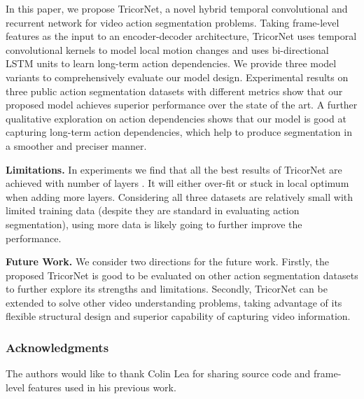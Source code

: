 \documentclass{article}
\begin{document}
In this paper, we propose TricorNet, a novel hybrid temporal convolutional and recurrent network for video action segmentation problems. Taking frame-level features as the input to an encoder-decoder architecture, TricorNet uses temporal convolutional kernels to model local motion changes and uses bi-directional LSTM units to learn long-term action dependencies. We provide three model variants to comprehensively evaluate our model design. Experimental results on three public action segmentation datasets with different metrics show that our proposed model achieves superior performance over the state of the art. A further qualitative exploration on action dependencies shows that our model is good at capturing long-term action dependencies, which help to produce segmentation in a smoother and preciser manner. 

\noindent \textbf{Limitations.} In experiments we find that all the best results of TricorNet are achieved with number of layers . It will either over-fit or stuck in local optimum when adding more layers. Considering all three datasets are relatively small with limited training data (despite they are standard in evaluating action segmentation), using more data is likely going to further improve the performance.

\noindent \textbf{Future Work.} We consider two directions for the future work. Firstly, the proposed TricorNet is good to be evaluated on other action segmentation datasets to further explore its strengths and limitations. Secondly, TricorNet can be extended to solve other video understanding problems, taking advantage of its flexible structural design and superior capability of capturing video information.


\subsubsection*{Acknowledgments}
The authors would like to thank Colin Lea for sharing source code and frame-level features used in his previous work.

\small


\end{document}
